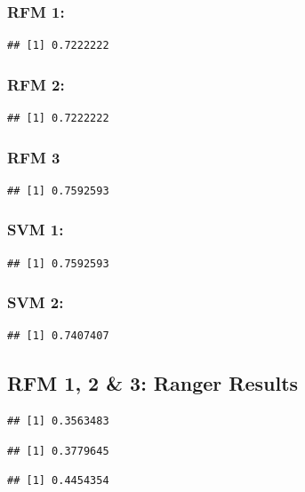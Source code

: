 \documentclass[11pt,preprint, authoryear]{elsarticle}
\numberwithin{equation}{section}
\numberwithin{figure}{section}
\numberwithin{table}{section}
\begin{document}
\hypertarget{rfm-1}{%
\subsubsection{RFM 1:}\label{rfm-1}}

\begin{verbatim}
## [1] 0.7222222
\end{verbatim}

\hypertarget{rfm-2}{%
\subsubsection{RFM 2:}\label{rfm-2}}

\begin{verbatim}
## [1] 0.7222222
\end{verbatim}

\hypertarget{rfm-3}{%
\subsubsection{RFM 3}\label{rfm-3}}

\begin{verbatim}
## [1] 0.7592593
\end{verbatim}

\hypertarget{svm-1}{%
\subsubsection{SVM 1:}\label{svm-1}}

\begin{verbatim}
## [1] 0.7592593
\end{verbatim}

\hypertarget{svm-2}{%
\subsubsection{SVM 2:}\label{svm-2}}

\begin{verbatim}
## [1] 0.7407407
\end{verbatim}

\hypertarget{rfm-1-2-3-ranger-results}{%
\subsection{RFM 1, 2 \& 3: Ranger
Results}\label{rfm-1-2-3-ranger-results}}

\begin{verbatim}
## [1] 0.3563483
\end{verbatim}

\begin{verbatim}
## [1] 0.3779645
\end{verbatim}

\begin{verbatim}
## [1] 0.4454354
\end{verbatim}


\end{document}
